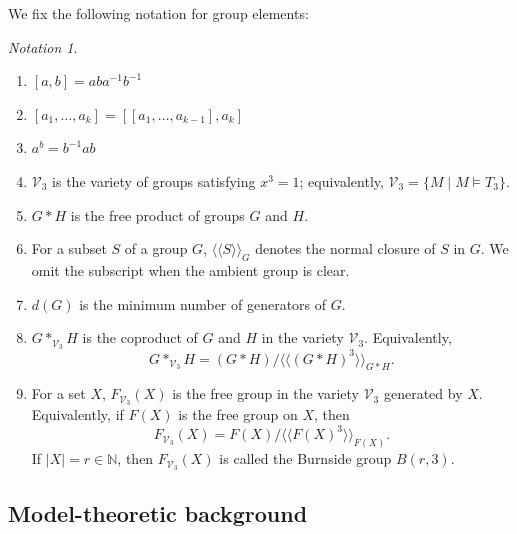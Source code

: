 \documentclass[11pt,reqno]{article}
\theoremstyle{definition}
\theoremstyle{remark}
\newtheorem{notation}[theorem]{Notation}
\newcommand{\llangle}{\langle\!\langle}
\newcommand{\rrangle}{\rangle\!\rangle}
\begin{document}
We fix the following notation for group elements:
\begin{notation}
    \begin{enumerate}
        \item $[a,b]=aba^{-1}b^{-1}$
        \item $[a_1,\ldots,a_k]=[[a_1,\ldots,a_{k-1}],a_k]$
        \item $a^b=b^{-1}ab$
        \item $\mathcal V_3$ is the variety of groups satisfying $x^3=1$; equivalently, $\mathcal V_3=\{M\mid M\models T_3\}$.
        \item $G*H$ is the free product of groups $G$ and $H$.
        \item For a subset $S$ of a group $G$, $\llangle S\rrangle_G$ denotes
        the normal closure of $S$ in $G$.  We omit the subscript when the
        ambient group is clear.
        \item $d(G)$ is the minimum number of generators of $G$. 
        \item $G*_{\mathcal V_3}H$ is the coproduct of $G$ and $H$ in the
        variety $\mathcal V_3$.  Equivalently,
        \[
        G*_{\mathcal V_3}H
        = (G*H)/\llangle (G*H)^3\rrangle_{G*H}.
        \]
        \item For a set $X$, $F_{\mathcal V_3}(X)$ is the free group in the
        variety $\mathcal V_3$ generated by $X$.  Equivalently, if $F(X)$ is
        the free group on $X$, then
        \[
        F_{\mathcal V_3}(X)
        =F(X)/\llangle F(X)^3\rrangle_{F(X)}.
        \]
        If $|X|=r\in\mathbb N$, then $F_{\mathcal V_3}(X)$ is called the
        Burnside group $B(r,3)$.
    \end{enumerate}
\end{notation}


\subsection{Model-theoretic background}
\end{document}
